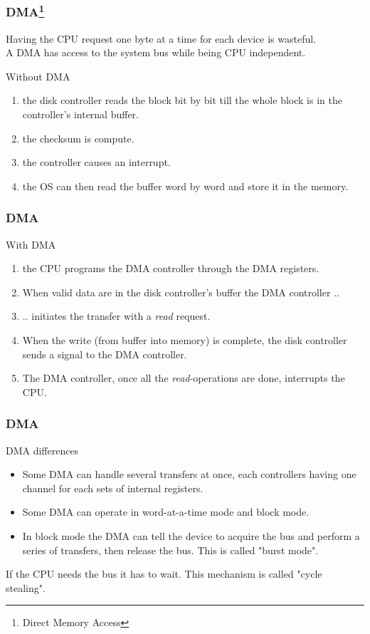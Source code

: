 \begin{frame}
  \frametitle{DMA\footnote{Direct Memory Access}}
  Having the CPU request one byte at a time for each device is wasteful.\\
  A DMA has access to the system bus while being CPU independent.
  \begin{block}{Without DMA}
    \begin{enumerate}
      \item the disk controller reads the block bit by bit till the whole block is in the controller's internal buffer.
      \item the checksum is compute.
      \item the controller causes an interrupt.
      \item the OS can then read the buffer word by word and store it in the memory.
    \end{enumerate}
  \end{block}
\end{frame}

\begin{frame}
  \frametitle{DMA}
  \begin{block}{With DMA}
    \begin{enumerate}
      \item the CPU programs the DMA controller through the DMA registers.
      \item When valid data are in the disk controller's buffer the DMA controller ..
      \item .. initiates the transfer with a \emph{read} request.
      \item When the write (from buffer into memory) is complete, the disk controller sends a signal to the DMA controller.
      \item The DMA controller, once all the \emph{read}-operations are done, interrupts the CPU.
    \end{enumerate}
  \end{block}
\end{frame}

\begin{frame}
  \frametitle{DMA}
  \begin{block}{DMA differences}
    \begin{itemize}
      \item Some DMA can handle several transfers at once, each controllers having one channel for each sets of internal registers.
      \item Some DMA can operate in word-at-a-time mode and block mode.
      \item In block mode the DMA can tell the device to acquire the bus and perform a series of transfers, then release the bus. This is called "burst mode".
    \end{itemize}
  \end{block}
  If the CPU needs the bus it has to wait. This mechanism is called "cycle stealing".
\end{frame}

